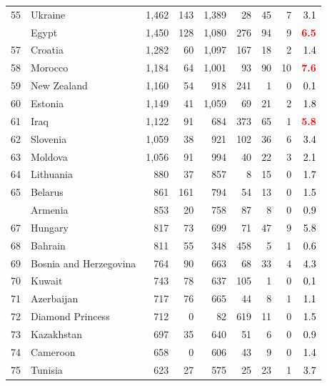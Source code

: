 \documentclass[12pt, a4paper,oneside]{book}
\theoremstyle{definition}
\begin{document}
\begin{longtable}{llrrrrrrr}
	\rowcolor{gray!6}  55 & Ukraine & 1,462 & 143 & 1,389 & 28 & 45 & 7 & \textcolor{black}{3.1}\\
	\addlinespace
	56 & Egypt & 1,450 & 128 & 1,080 & 276 & 94 & 9 & \textcolor{red}{\textbf{6.5}}\\
	\rowcolor{gray!6}  57 & Croatia & 1,282 & 60 & 1,097 & 167 & 18 & 2 & \textcolor{black}{1.4}\\
	58 & Morocco & 1,184 & 64 & 1,001 & 93 & 90 & 10 & \textcolor{red}{\textbf{7.6}}\\
	\rowcolor{gray!6}  59 & New Zealand & 1,160 & 54 & 918 & 241 & 1 & 0 & \textcolor{black}{0.1}\\
	60 & Estonia & 1,149 & 41 & 1,059 & 69 & 21 & 2 & \textcolor{black}{1.8}\\
	\addlinespace
	\rowcolor{gray!6}  61 & Iraq & 1,122 & 91 & 684 & 373 & 65 & 1 & \textcolor{red}{\textbf{5.8}}\\
	62 & Slovenia & 1,059 & 38 & 921 & 102 & 36 & 6 & \textcolor{black}{3.4}\\
	\rowcolor{gray!6}  63 & Moldova & 1,056 & 91 & 994 & 40 & 22 & 3 & \textcolor{black}{2.1}\\
	64 & Lithuania & 880 & 37 & 857 & 8 & 15 & 0 & \textcolor{black}{1.7}\\
	\rowcolor{gray!6}  65 & Belarus & 861 & 161 & 794 & 54 & 13 & 0 & \textcolor{black}{1.5}\\
	\addlinespace
	66 & Armenia & 853 & 20 & 758 & 87 & 8 & 0 & \textcolor{black}{0.9}\\
	\rowcolor{gray!6}  67 & Hungary & 817 & 73 & 699 & 71 & 47 & 9 & \textcolor{black}{5.8}\\
	68 & Bahrain & 811 & 55 & 348 & 458 & 5 & 1 & \textcolor{black}{0.6}\\
	\rowcolor{gray!6}  69 & Bosnia and Herzegovina & 764 & 90 & 663 & 68 & 33 & 4 & \textcolor{black}{4.3}\\
	70 & Kuwait & 743 & 78 & 637 & 105 & 1 & 0 & \textcolor{black}{0.1}\\
	\addlinespace
	\rowcolor{gray!6}  71 & Azerbaijan & 717 & 76 & 665 & 44 & 8 & 1 & \textcolor{black}{1.1}\\
	72 & Diamond Princess & 712 & 0 & 82 & 619 & 11 & 0 & \textcolor{black}{1.5}\\
	\rowcolor{gray!6}  73 & Kazakhstan & 697 & 35 & 640 & 51 & 6 & 0 & \textcolor{black}{0.9}\\
	74 & Cameroon & 658 & 0 & 606 & 43 & 9 & 0 & \textcolor{black}{1.4}\\
	\rowcolor{gray!6}  75 & Tunisia & 623 & 27 & 575 & 25 & 23 & 1 & \textcolor{black}{3.7}\\

\end{longtable}
\end{document}
